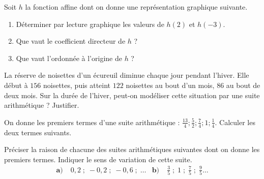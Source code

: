 \documentclass[11pt]{article}
\begin{document}
\begin{exo}
  \begin{minipage}{.48\textwidth}
    Soit $h$ la fonction affine dont on donne une représentation graphique
    suivante.
    \begin{enumerate}
      \item Déterminer par lecture graphique les valeurs de $h(2)$ et $h(-3)$.
      \item Que vaut le coefficient directeur de $h$ ?
      \item Que vaut l'ordonnée à l'origine de $h$ ?
    \end{enumerate}
  \end{minipage}
  \hfill
  \begin{minipage}{.48\textwidth}
    \begin{center}
    \end{center}
  \end{minipage}
\end{exo}

\begin{exo}
  La réserve de noisettes d'un écureuil diminue chaque jour pendant l'hiver.
  Elle début à $156$ noisettes, puis atteint $122$ noisettes au bout d'un mois,
  $86$ au bout de deux mois. Sur la durée de l'hiver, peut-on modéliser cette
  situation par une suite arithmétique ? Justifier.
\end{exo}

\begin{exo}
  On donne les premiers termes d'une suite arithmétique : $\frac{13}{4};
  \frac{5}{2} ; \frac{7}{4}; 1; \frac{1}{4}$. Calculer les deux termes suivants.
\end{exo}

\begin{exo}
  Préciser la raison de chacune des suites arithmétiques suivantes dont on donne
les premiers termes. Indiquer le sens de variation de cette suite.
\begin{align*}
  \textbf{a)}&\; 0,2 \;;\; -0,2 \;;\; -0,6 \;;\; \ldots &
  \textbf{b)}&\; \frac{3}{5} \;; \;1 \;; \;\frac{7}{5} \;; \;\frac{9}{5} \ldots
\end{align*}
\end{exo}
\end{document}
